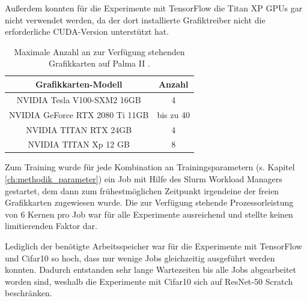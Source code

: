 Außerdem konnten für die Experimente mit TensorFlow \cite{tensorflow} die Titan XP GPUs gar nicht verwendet werden, da der dort installierte Grafiktreiber nicht die erforderliche CUDA-Version unterstützt hat.

\begin{table}[H]
\centering
\begin{adjustbox}{scale=.9, center}
\begin{tabular}{|c|c|}
\hline 
Grafikkarten-Modell & Anzahl \\ 
\hline 
NVIDIA Tesla V100-SXM2 16GB & 4 \\ 
\hline 
NVIDIA GeForce RTX 2080 Ti 11GB & bis zu 40\\
\hline
NVIDIA TITAN RTX 24GB & 4\\
\hline
NVIDIA TITAN Xp 12 GB & 8\\
\hline
\end{tabular} 
\end{adjustbox}
\caption{Maximale Anzahl an zur Verfügung stehenden Grafikkarten auf Palma II \cite{palma2}.}
\label{tab:palmaGPUs}
\end{table}


Zum Training wurde für jede Kombination an Trainingsparametern (s. Kapitel \ref{ch:methodik_parameter}) ein Job mit Hilfe des Slurm Workload Managers \cite{slurm} gestartet, dem dann zum frühestmöglichen Zeitpunkt irgendeine der freien Grafikkarten zugewiesen wurde. Die zur Verfügung stehende Prozessorleistung von 6 Kernen pro Job war für alle Experimente ausreichend und stellte keinen limitierenden Faktor dar.

Lediglich der benötigte Arbeitsspeicher war für die Experimente mit TensorFlow \cite{tensorflow} und Cifar10 \cite{cifar10} so hoch, dass nur wenige Jobs gleichzeitig ausgeführt werden konnten. Dadurch entstanden sehr lange Wartezeiten bis alle Jobs abgearbeitet worden sind, weshalb die Experimente mit Cifar10 \cite{cifar10} sich auf ResNet-50 Scratch beschränken.

